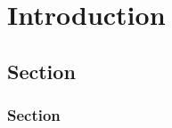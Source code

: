 \chapter{Introduction}
\label{cha:intro}

\section{Section}
\label{sec:basis}

\subsection{Section}
\label{sec:framework}

